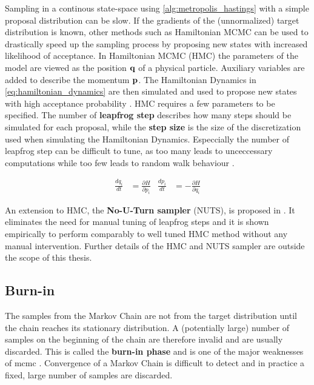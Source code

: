 Sampling in a continous state-space using \cref{alg:metropolis_hastings} with a simple proposal distribution can be slow. If the gradients of the (unnormalized) target distribution is known, other methods such as Hamiltonian MCMC can be used to drastically speed up the sampling process by proposing new states with increased likelihood of acceptance. In Hamiltonian MCMC (HMC) the parameters of the model are viewed as the position $\bf q$ of a physical particle. Auxiliary variables are added to describe the momentum $\bf p$. The Hamiltonian Dynamics in \cref{eq:hamiltonian_dynamics} are then simulated and used to propose new states with high acceptance probability \cite{neal2012mcmc,murphy,hoffman2011nouturn}. HMC requires a few parameters to be specified. The number of \textbf{leapfrog step} describes how many steps should be simulated for each proposal, while the \textbf{step size} is the size of the discretization used when simulating the Hamiltonian Dynamics. Especcially the number of leapfrog step can be difficult to tune, as too many leads to unceccessary computations while too few leads to random walk behaviour \cite{hoffman2011nouturn}. 

\begin{align}\label{eq:hamiltonian_dynamics}
    \frac{d q_i}{dt} &= \frac{\partial H}{\partial p_i} & \frac{d p_i}{dt} &= -\frac{\partial H}{\partial q_i}
\end{align}

An extension to HMC, the \textbf{No-U-Turn sampler} (NUTS), is proposed in \cite{hoffman2011nouturn}. It eliminates the need for manual tuning of leapfrog steps and it is shown empirically to perform comparably to well tuned HMC method \cite{hoffman2011nouturn} without any manual intervention. Further details of the HMC and NUTS sampler are outside the scope of this thesis.   



\subsection{Burn-in}
The samples from the Markov Chain are not from the target distribution until the chain reaches its stationary distribution. A (potentially large) number of samples on the beginning of the chain are therefore invalid and are usually discarded. This is called the \textbf{burn-in phase} and is one of the major weaknesses of \acrshort{mcmc} \cite{murphy}. Convergence of a Markov Chain is difficult to detect and in practice a fixed, large number of samples are discarded.   

